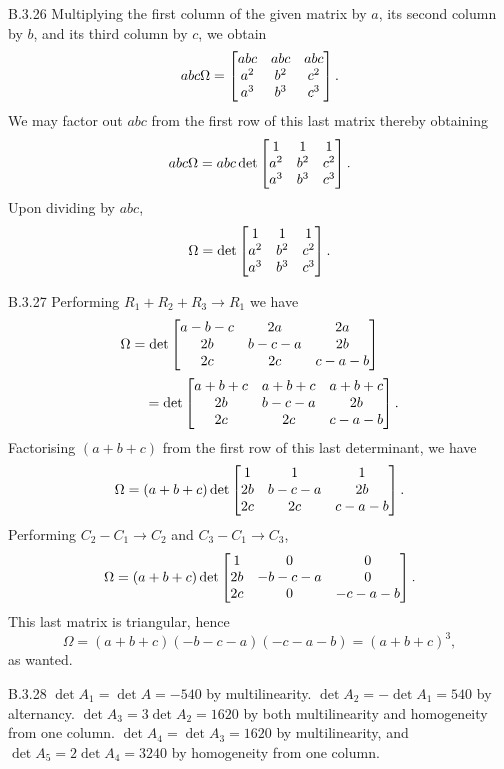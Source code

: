 \begin{Answer}{B.3.26}
 Multiplying the first column of the given matrix  by $a$,
its second column by $b$, and its third column by $c$, we obtain
$$abc\Omega =  \begin{bmatrix} abc & abc & abc \cr a^2 & b^2 & c^2 \cr a^3 & b^3 & c^3 \cr\end{bmatrix}. $$ We may factor out
$abc$ from the first row of this last matrix thereby obtaining
$$abc\Omega = abc\det
\begin{bmatrix} 1 & 1 & 1 \cr a^2 & b^2 & c^2 \cr a^3 & b^3 & c^3
\cr\end{bmatrix}. $$Upon dividing by $abc$,
$$\Omega = \det
\begin{bmatrix} 1 & 1 & 1 \cr a^2 & b^2 & c^2 \cr a^3 & b^3 & c^3
\cr\end{bmatrix}.
$$
\end{Answer}
\begin{Answer}{B.3.27}
 Performing $R_1 + R_2 + R_3 \rightarrow R_1$ we have
$$\begin{array}{l}
\Omega = \det\begin{bmatrix} a - b - c & 2a & 2a \cr 2b & b - c -
a & 2b \cr 2c & 2c & c - a - b \cr
\end{bmatrix}\vspace{2mm}\\ \qquad = \det\begin{bmatrix} a + b + c & a + b + c & a + b + c \cr 2b
& b - c - a & 2b \cr 2c & 2c & c - a - b \cr
\end{bmatrix}.\end{array}$$ Factorising $(a + b + c)$ from the first row of
this last determinant, we have
$$\Omega =   (a + b + c)\det\begin{bmatrix} 1 & 1 & 1 \cr 2b
& b - c - a & 2b \cr 2c & 2c & c - a - b \cr
\end{bmatrix}. $$Performing $C_2 - C_1 \rightarrow C_2$ and $C_3 - C_1 \rightarrow
C_3$,
$$\Omega =   (a + b + c)\det\begin{bmatrix} 1 & 0 & 0 \cr 2b
& -b - c - a & 0 \cr 2c & 0 & -c - a - b \cr
\end{bmatrix}. $$This last matrix is triangular, hence $$\Omega = (a + b + c)(-b - c - a)(-c -a - b) = (a + b + c)^3,  $$
as wanted.
\end{Answer}
\begin{Answer}{B.3.28}
 $\det A_1 = \det A = -540$ by multilinearity. $\det A_2 = -\det
 A_1 = 540$ by alternancy. $\det A_3 = 3\det A_2 = 1620$  by both
 multilinearity and homogeneity from one column. $\det A_4 = \det A_3
 = 1620$ by multilinearity, and $\det A_5 = 2\det A_4 = 3240$ by
 homogeneity from one column.
 
\end{Answer}
